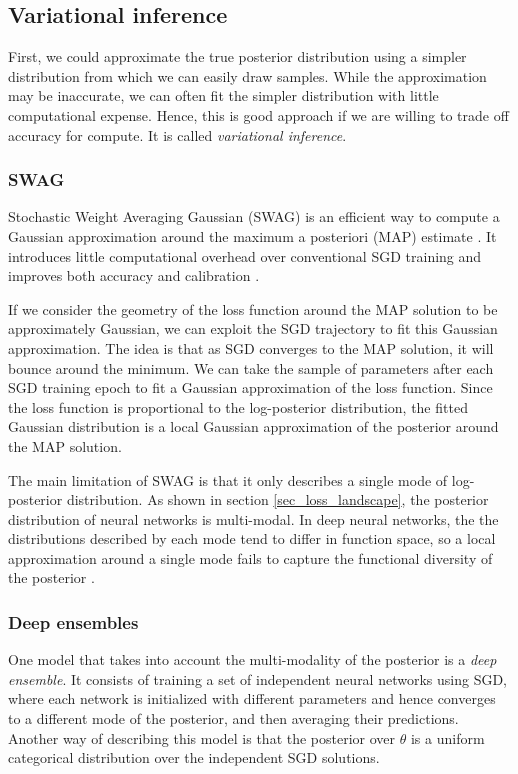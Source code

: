 \documentclass[12pt]{article}
\begin{document}
{\subsection{Variational inference}
\label{sec_vi}

First, we could approximate the true posterior distribution using a simpler distribution from which we can easily draw samples. While the approximation may be inaccurate, we can often fit the simpler distribution with little computational expense. Hence, this is good approach if we are willing to trade off accuracy for compute. It is called \textit{variational inference}.

\subsubsection{SWAG}

Stochastic Weight Averaging Gaussian (SWAG) is an efficient way to compute a Gaussian approximation around the maximum a posteriori (MAP) estimate \cite{swag}. It introduces little computational overhead over conventional SGD training and improves both accuracy and calibration \cite{swag}.

If we consider the geometry of the loss function around the MAP solution to be approximately Gaussian, we can exploit the SGD trajectory to fit this Gaussian approximation. The idea is that as SGD converges to the MAP solution, it will bounce around the minimum. We can take the sample of parameters after each SGD training epoch to fit a Gaussian approximation of the loss function. Since the loss function is proportional to the log-posterior distribution, the fitted Gaussian distribution is a local Gaussian approximation of the posterior around the MAP solution.

The main limitation of SWAG is that it only describes a single mode of log-posterior distribution. As shown in section \ref{sec_loss_landscape}, the posterior distribution of neural networks is multi-modal. In deep neural networks, the the distributions described by each mode tend to differ in function space, so a local approximation around a single mode fails to capture the functional diversity of the posterior \cite{deep_ens}.

\subsubsection{Deep ensembles}

One model that takes into account the multi-modality of the posterior is a \textit{deep ensemble}. It consists of training a set of independent neural networks using SGD, where each network is initialized with different parameters and hence converges to a different mode of the posterior, and then averaging their predictions. Another way of describing this model is that the posterior over $\theta$ is a uniform categorical distribution over the independent SGD solutions.

}
\end{document}
